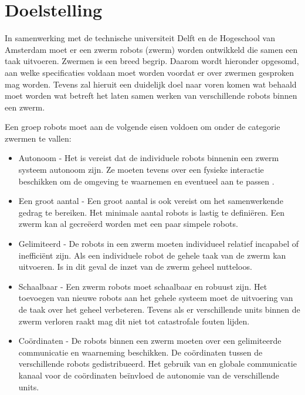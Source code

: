 \documentclass[10pt,a4paper]{article}
\begin{document}
\section{Doelstelling}
In samenwerking met de technische universiteit Delft en de Hogeschool van Amsterdam moet er een zwerm robots (zwerm) worden ontwikkeld die samen een taak uitvoeren. Zwermen is een breed begrip. Daarom wordt hieronder opgesomd, aan welke specificaties voldaan moet worden voordat er over zwermen gesproken mag worden. Tevens zal hieruit een duidelijk doel naar voren komen wat behaald moet worden wat betreft het laten samen werken van verschillende robots binnen een zwerm.

Een groep robots moet aan de volgende eisen voldoen om onder de categorie zwermen te vallen:

\begin{itemize}

\item Autonoom		-	Het is vereist dat de  individuele  robots  binnenin  een  zwerm   
systeem autonoom zijn. Ze moeten tevens over een fysieke interactie beschikken om de omgeving te waarnemen en eventueel aan te passen \cite{swarmintelligence}.

\item Een groot aantal	-	Een groot aantal is ook vereist om het samenwerkende gedrag
te bereiken. Het minimale aantal robots is lastig te definiëren. Een zwerm kan al gecre\"eerd worden met een paar simpele robots\cite{swarmintelligence}.
\item Gelimiteerd	-	De robots in een zwerm moeten individueel relatief incapabel
of ineffici\"ent zijn. Als een individuele robot de gehele taak van
de zwerm kan uitvoeren. Is in dit geval de inzet van de zwerm geheel nutteloos\cite{swarmintelligence}.

\item Schaalbaar		-	Een   zwerm    robots moet   schaalbaar  en   robuust   zijn. Het
toevoegen van nieuwe robots aan het gehele systeem moet de uitvoering van de taak over het geheel verbeteren. Tevens als er verschillende units binnen de zwerm verloren raakt mag dit niet tot catastrofale fouten lijden\cite{swarmintelligence}.

\item Co\"ordinaten	-	De robots   binnen een zwerm  moeten over een  gelimiteerde
communicatie en waarneming beschikken. De coördinaten tussen de verschillende robots gedistribueerd. Het gebruik van en globale communicatie kanaal voor de co\"ordinaten be\"invloed de autonomie van de verschillende units\cite{swarmintelligence}.
\end{itemize}
\end{document}
